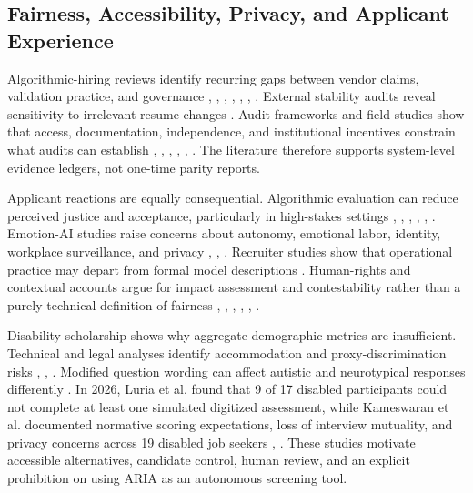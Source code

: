 \documentclass[journal]{IEEEtran}
\begin{document}
\subsection{Fairness, Accessibility, Privacy, and Applicant Experience}

Algorithmic-hiring reviews identify recurring gaps between vendor claims, validation practice, and governance \cite{raghavan2020bias}, \cite{tippins2021concerns}, \cite{fabris2025survey}, \cite{hunkenschroer2022ethics}, \cite{kassir2022context}, \cite{hughes2025inequalities}, \cite{zhao2026recruitingagents}. External stability audits reveal sensitivity to irrelevant resume changes \cite{rhea2022stability}. Audit frameworks and field studies show that access, documentation, independence, and institutional incentives constrain what audits can establish \cite{kazim2021audit}, \cite{wilson2021fairalgorithms}, \cite{mihaljevic2023auditing}, \cite{gerchick2025audits}, \cite{costanzachock2022auditors}, \cite{raji2022oversight}. The literature therefore supports system-level evidence ledgers, not one-time parity reports.


Applicant reactions are equally consequential. Algorithmic evaluation can reduce perceived justice and acceptance, particularly in high-stakes settings \cite{acikgoz2020justice}, \cite{oostrom2023reactions}, \cite{pyle2024justice}, \cite{langer2019acceptance}, \cite{liu2023uncertainty}, \cite{hilliard2022perceived}. Emotion-AI studies raise concerns about autonomy, emotional labor, identity, workplace surveillance, and privacy \cite{ingber2025emotion}, \cite{roemmich2023values}, \cite{roemmich2023privacy}. Recruiter studies show that operational practice may depart from formal model descriptions \cite{li2021practice}. Human-rights and contextual accounts argue for impact assessment and contestability rather than a purely technical definition of fairness \cite{sanchezmonedero2020discrimination}, \cite{hunkenschroer2022ethics}, \cite{sloane2022auditability}, \cite{aizenberg2023autonomy}, \cite{kassir2022context}, \cite{yam2021impact}.


Disability scholarship shows why aggregate demographic metrics are insufficient. Technical and legal analyses identify accommodation and proxy-discrimination risks \cite{buyl2022disability}, \cite{tilmes2022disability}, \cite{fisher2024disability}. Modified question wording can affect autistic and neurotypical responses differently \cite{benson2024autistic}. In 2026, Luria et al. found that 9 of 17 disabled participants could not complete at least one simulated digitized assessment, while Kameswaran et al. documented normative scoring expectations, loss of interview mutuality, and privacy concerns across 19 disabled job seekers \cite{luria2026disability}, \cite{kameswaran2026surveilling}. These studies motivate accessible alternatives, candidate control, human review, and an explicit prohibition on using ARIA as an autonomous screening tool.
\end{document}
